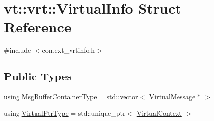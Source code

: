 \hypertarget{structvt_1_1vrt_1_1_virtual_info}{}\section{vt\+:\+:vrt\+:\+:Virtual\+Info Struct Reference}
\label{structvt_1_1vrt_1_1_virtual_info}


{\ttfamily \#include $<$context\+\_\+vrtinfo.\+h$>$}

\subsection*{Public Types}
\begin{DoxyCompactItemize}
\item 
using \hyperlink{structvt_1_1vrt_1_1_virtual_info_a58e94aae79e1e8f0bb4c2bf6c7ba608e}{Msg\+Buffer\+Container\+Type} = std\+::vector$<$ \hyperlink{structvt_1_1vrt_1_1_virtual_message}{Virtual\+Message} $\ast$ $>$
\item 
using \hyperlink{structvt_1_1vrt_1_1_virtual_info_aede28e76785423dd2685fe4cf54afa21}{Virtual\+Ptr\+Type} = std\+::unique\+\_\+ptr$<$ \hyperlink{structvt_1_1vrt_1_1_virtual_context}{Virtual\+Context} $>$
\end{DoxyCompactItemize}
